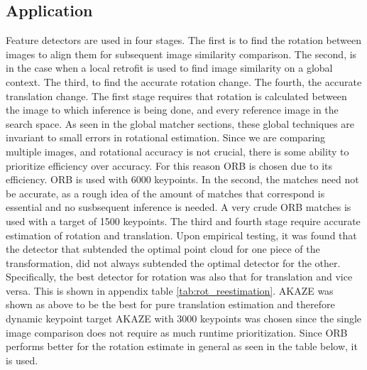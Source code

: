\subsection*{Application}
Feature detectors are used in four stages. The first is to find the rotation between images to align them for subsequent image similarity comparison. The second, is in the case when a local retrofit is used to find image similarity on a global context. The third, to find the accurate rotation change. The fourth, the accurate translation change. 
The first stage requires that rotation is calculated between the image to which inference is being done, and every reference image in the search space. As seen in the global matcher sections, these global techniques are invariant to small errors in rotational estimation. Since we are comparing multiple images, and rotational accuracy is not crucial, there is some ability to prioritize efficiency over accuracy. For this reason ORB is chosen due to its efficiency. ORB is used with 6000 keypoints. 
In the second, the matches need not be accurate, as a rough idea of the amount of matches that correspond is essential and no susbsequent inference is needed. A very crude ORB matches is used with a target of 1500 keypoints.
The third and fourth stage require accurate estimation of rotation and translation. Upon empirical testing, it was found that the detector that subtended the optimal point cloud for one piece of the transformation, did not always subtended the optimal detector for the other. Specifically, the best detector for rotation was also that for translation and vice versa. This is shown in appendix table \ref{tab:rot_reestimation}. AKAZE was shown as above to be the best for pure translation estimation and therefore dynamic keypoint target AKAZE with 3000 keypoints was chosen since the single image comparison does not require as much runtime prioritization. Since ORB performs better for the rotation estimate in general as seen in the table below, it is used. 


